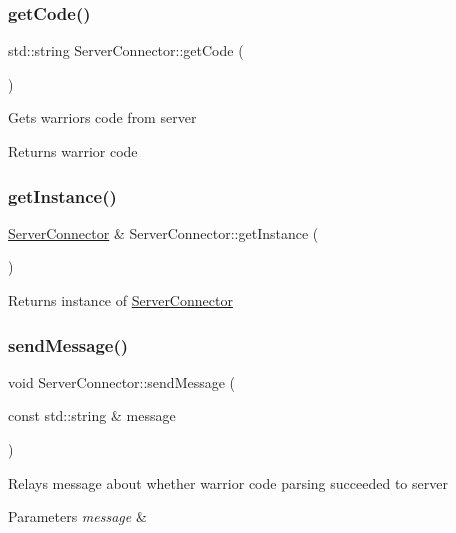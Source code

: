 \subsubsection{\texorpdfstring{get\+Code()}{getCode()}}
{\footnotesize\ttfamily std\+::string Server\+Connector\+::get\+Code (\begin{DoxyParamCaption}{ }\end{DoxyParamCaption})}

Gets warrior\textquotesingle{}s code from server \begin{DoxyReturn}{Returns}
warrior code 
\end{DoxyReturn}
\mbox{\label{classServerConnector_a1b254a471399bbb440ea7978cba085c9}} 
\subsubsection{\texorpdfstring{get\+Instance()}{getInstance()}}
{\footnotesize\ttfamily \hyperlink{classServerConnector}{Server\+Connector} \& Server\+Connector\+::get\+Instance (\begin{DoxyParamCaption}{ }\end{DoxyParamCaption})\hspace{0.3cm}{\ttfamily [static]}}

\begin{DoxyReturn}{Returns}
instance of \hyperlink{classServerConnector}{Server\+Connector} 
\end{DoxyReturn}
\mbox{\label{classServerConnector_a2963c73cef3f803103a558cd13d5ed86}} 
\subsubsection{\texorpdfstring{send\+Message()}{sendMessage()}}
{\footnotesize\ttfamily void Server\+Connector\+::send\+Message (\begin{DoxyParamCaption}\item[{const std\+::string \&}]{message }\end{DoxyParamCaption})}

Relays message about whether warrior code parsing succeeded to server 
\begin{DoxyParams}{Parameters}
{\em message} & \\
\hline
\end{DoxyParams}
\mbox{\label{classServerConnector_a382cdb4cb863d8c073c6f1a5154e5bce}} 
